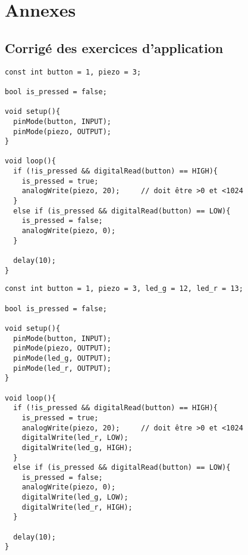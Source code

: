 \section{Annexes}

\subsection{Corrigé des exercices d'application}




\begin{tcolorbox}[colback=yellow-atelier!10, colframe=gray!70!black, coltitle=black, colbacktitle=gray!70!white, title={\textit{Envie de buzzer...}}, leftrule=2mm]
\begin{small}
\begin{verbatim}
const int button = 1, piezo = 3;

bool is_pressed = false;

void setup(){
  pinMode(button, INPUT);
  pinMode(piezo, OUTPUT);
}

void loop(){  
  if (!is_pressed && digitalRead(button) == HIGH){
    is_pressed = true;
    analogWrite(piezo, 20); 	// doit être >0 et <1024
  }
  else if (is_pressed && digitalRead(button) == LOW){
    is_pressed = false;
    analogWrite(piezo, 0);
  }
  
  delay(10);
}
\end{verbatim}
\end{small}
\end{tcolorbox}

\begin{tcolorbox}[colback=yellow-atelier!10, colframe=gray!70!black, coltitle=black, colbacktitle=gray!70!white, title={\textit{Que la lumière soit !}}, leftrule=2mm]
\begin{small}
\begin{verbatim}
const int button = 1, piezo = 3, led_g = 12, led_r = 13;

bool is_pressed = false;

void setup(){
  pinMode(button, INPUT);
  pinMode(piezo, OUTPUT);
  pinMode(led_g, OUTPUT);
  pinMode(led_r, OUTPUT);
}

void loop(){
  if (!is_pressed && digitalRead(button) == HIGH){
    is_pressed = true;
    analogWrite(piezo, 20); 	// doit être >0 et <1024
    digitalWrite(led_r, LOW);
    digitalWrite(led_g, HIGH);
  }
  else if (is_pressed && digitalRead(button) == LOW){
    is_pressed = false;
    analogWrite(piezo, 0);
    digitalWrite(led_g, LOW);
    digitalWrite(led_r, HIGH);
  }
  
  delay(10);
}
\end{verbatim}
\end{small}
\end{tcolorbox}

